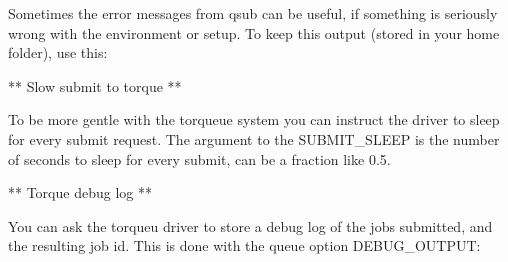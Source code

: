 \documentclass[letterpaper,10pt,english]{sphinxmanual}
\begin{document}

Sometimes the error messages from qsub can be useful, if something is seriously
wrong with the environment or setup. To keep this output (stored in your home
folder), use this:

%
\begin{sphinxVerbatim}[commandchars=\\\{\}]
   
\end{sphinxVerbatim}

** Slow submit to torque **

To be more gentle with the torqueue system you can instruct the driver to sleep
for every submit request. The argument to the SUBMIT\_SLEEP is the number of
seconds to sleep for every submit, can be a fraction like 0.5.

%
\begin{sphinxVerbatim}[commandchars=\\\{\}]
   
\end{sphinxVerbatim}

** Torque debug log **

You can ask the torqueu driver to store a debug log of the jobs submitted, and
the resulting job id. This is done with the queue option DEBUG\_OUTPUT:

%
\begin{sphinxVerbatim}[commandchars=\\\{\}]
   
\end{sphinxVerbatim}
\end{document}
